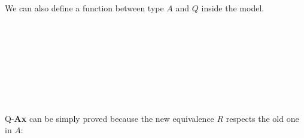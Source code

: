 We can also define a function between type $A$ and $Q$ inside the model.

\begin{code}
\>[0]\<[2]%
\>[2] \AgdaSymbol{:}  \AgdaSymbol{(}  \AgdaSymbol{)}\<%
\\
\>[0]\<[2]%
\>[2] \AgdaSymbol{=} \<%
\\
\>[2]\<[11]%
\>[11]\AgdaSymbol{\{}  \AgdaSymbol{=}       \AgdaSymbol{)} \AgdaInductiveConstructor{,} \<[36]%
\>[36]\<%
\\
\>[11]\<[18]%
\>[18]     \<[29]%
\>[29]\<%
\\
\>[11]\<[18]%
\>[18] \AgdaSymbol{(}\AgdaFunction{[} \AgdaFunction{[}  \AgdaFunction{]fm} \AgdaSymbol{\_} \AgdaFunction{]trans} \AgdaFunction{[}  \AgdaFunction{]refl*} \AgdaSymbol{))}\<%
\\
\>[0]\<[11]%
\>[11]\AgdaSymbol{;}  \AgdaSymbol{=}      \AgdaFunction{[}  \AgdaFunction{]tr*}\<%
\\
\>[0]\<[11]%
\>[11]\AgdaSymbol{\}}\<%
\\
\end{code}

Q-\textbf{Ax} can be simply proved because the new equivalence $R$ respects the old one in $A$:

\begin{code}
\\
\>[0]\<[2]%
\>[2] \AgdaSymbol{:}      \AgdaFunction{[} \AgdaFunction{[}  \AgdaFunction{]fm}  \AgdaFunction{]}     \AgdaFunction{[} \AgdaFunction{[}  \AgdaFunction{]fm} \AgdaSymbol{\_} \AgdaFunction{]}   \<%
\\
\>[0]\<[2]%
\>[2]    \AgdaSymbol{=} \<%
\\
\end{code}


